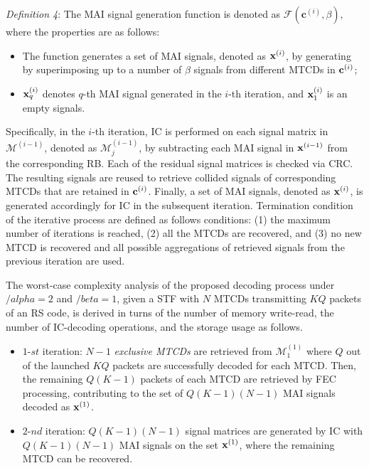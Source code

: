 \documentclass[a4paper]{IEEEtran}
\begin{document}
\textit{Definition 4}: The MAI signal generation function is denoted as $\mathcal{F}(\mathbf{c}^{(i)}, \beta)$, where the properties are as follows:
\begin{itemize}
\item The function generates a set of MAI signals, denoted as $\bold{x}^{(i)}$, by generating by superimposing up to a number of $\beta$ signals from different MTCDs in $\bold{c}^{(i)}$;
\item $\bold{x}^{(i)}_q$ denotes $q$-th MAI signal generated in the $i$-th iteration, and $\bold{x}^{(i)}_1$ is an empty signals.
\end{itemize}

Specifically, in the $i$-th iteration, IC is performed on each signal matrix in $\mathcal{M}^{(i-1)}$, denoted as $\mathcal{M}^{(i-1)}_{j}$, by subtracting each MAI signal in $\bold{x}^{(i-1)}$ from the corresponding RB. 
Each of the residual signal matrices is checked via CRC. The resulting signals are reused to retrieve collided signals of corresponding MTCDs that are retained in $\bold{c}^{(i)}$. 
Finally, a set of MAI signals, denoted as $\bold{x}^{(i)}$, is generated accordingly for IC in the subsequent iteration. 
Termination condition of the iterative process are defined as follows conditions: (1) the maximum number of iterations is reached, (2) all the MTCDs are recovered, and (3) no new MTCD is recovered and all possible aggregations of retrieved signals from the previous iteration are used.



The worst-case complexity analysis of the proposed decoding process under $/alpha=2$ and $/beta=1$, given a STF with $N$ MTCDs transmitting $KQ$ packets of an RS code, is derived in turns of the number of memory write-read, the number of IC-decoding operations, and the storage usage as follows.

\begin{itemize}
\item $1$-$st$ iteration: $N-1$ \textit{exclusive MTCDs} are retrieved from $\mathcal{M}^{(1)}_{1}$ where $Q$ out of the launched $KQ$ packets are successfully decoded for each MTCD. Then, the remaining $Q(K-1)$ packets of each MTCD are retrieved by FEC processing, contributing to the set of $Q(K-1)(N-1)$ MAI signals decoded as $\bold{x}^{(1)}$.
\item $2$-$nd$ iteration: $Q(K-1)(N-1)$ signal matrices are generated by IC with $Q(K-1)(N-1)$ MAI signals on the set $\bold{x}^{(1)}$, where the remaining MTCD can be recovered.
\end{itemize}
\end{document}
